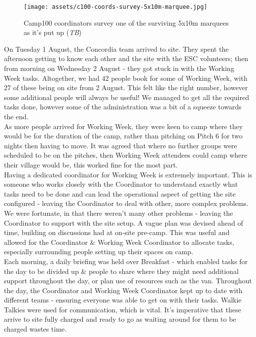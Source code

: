 \begin{figure}[ht]
    \centering
    \texttt{[image: assets/c100-coords-survey-5x10m-marquee.jpg]}
    \caption{Camp100 coordinators survey one of the surviving 5x10m marquees as it's put up (\textit{TB})}
\end{figure}

On Tuesday 1 August, the Concordia team arrived to site. They spent the afternoon getting to know each other and the site with the ESC volunteers; then from morning on Wednesday 2 August - they got stuck in with the Working Week tasks. Altogether, we had 42 people book for some of Working Week, with 27 of these being on site from 2 August. This felt like the right number, however some additional people will always be useful! We managed to get all the required tasks done, however some of the administration was a bit of a squeeze towards the end. \\

As more people arrived for Working Week, they were keen to camp where they would be for the duration of the camp, rather than pitching on Pitch 6 for two nights then having to move. It was agreed that where no further groups were scheduled to be on the pitches, then Working Week attendees could camp where their village would be, this worked fine for the most part. \\

Having a dedicated coordinator for Working Week is extremely important. This is someone who works closely with the Coordinator to understand exactly what tasks need to be done and can lead the operational aspect of getting the site configured - leaving the Coordinator to deal with other, more complex problems. We were fortunate, in that there weren't many other problems - leaving the Coordinator to support with the site setup. A vague plan was devised ahead of time, building on discussions had at on-site pre-camp. This was useful and allowed for the Coordinator \& Working Week Coordinator to allocate tasks, especially surrounding people setting up their spaces on camp.\\

Each morning, a daily briefing was held over Breakfast - which enabled tasks for the day to be divided up \& people to share where they might need additional support throughout the day, or plan use of resources such as the van. Throughout the day, the Coordinator and Working Week Coordinator kept up to date with different teams - ensuring everyone was able to get on with their tasks. Walkie Talkies were used for communication, which is vital. It's imperative that these arrive to site fully charged and ready to go as waiting around for them to be charged wastes time.\\

